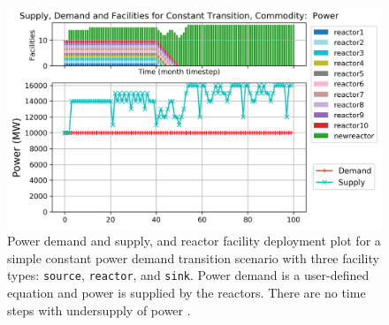     \begin{figure}[]
        \centering
        \includegraphics[width=0.9\linewidth]{figures/constanttransition-power.png} 
            \caption{Power demand and supply, and reactor facility deployment plot for  
            a simple constant power demand transition scenario with 
            three facility types: \texttt{source}, \texttt{reactor}, and \texttt{sink}.
            Power demand is a user-defined equation and power is supplied by the reactors.
            There are no time steps with undersupply of power 
            \cite{chee_arfc/transition-scenarios_2018}.}
            \label{fig:constanttransition-power}
    \end{figure}

